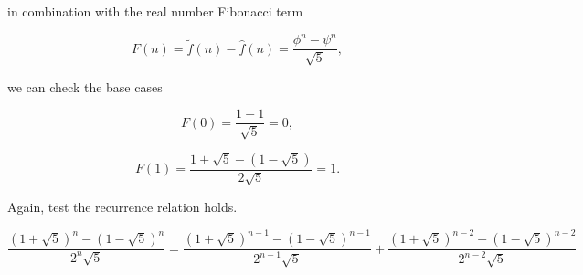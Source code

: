 \documentclass{article}
\begin{document}
in combination with the real number Fibonacci term

\begin{equation}
  F(n) = \tilde{f}(n) - \hat{f}(n) = \frac{\phi^n - \psi^n}{\sqrt{5}},
\end{equation}

we can check the base cases

\begin{equation}
  F(0) = \frac{1 - 1}{\sqrt{5}} = 0,
\end{equation}

\begin{equation}
  F(1) = \frac{1 + \sqrt{5} - (1 - \sqrt{5})}{2 \sqrt{5}} = 1.
\end{equation}

Again, test the recurrence relation holds.

\begin{equation}
  \frac{(1 + \sqrt{5})^{n} - (1 - \sqrt{5})^{n}}{2^n \sqrt{5}} = \frac{(1 + \sqrt{5})^{n-1} - (1 - \sqrt{5})^{n-1}}{2^{n-1} \sqrt{5}} + \frac{(1 + \sqrt{5})^{n-2} - (1 - \sqrt{5})^{n-2}}{2^{n-2} \sqrt{5}} 
\end{equation}
\end{document}

